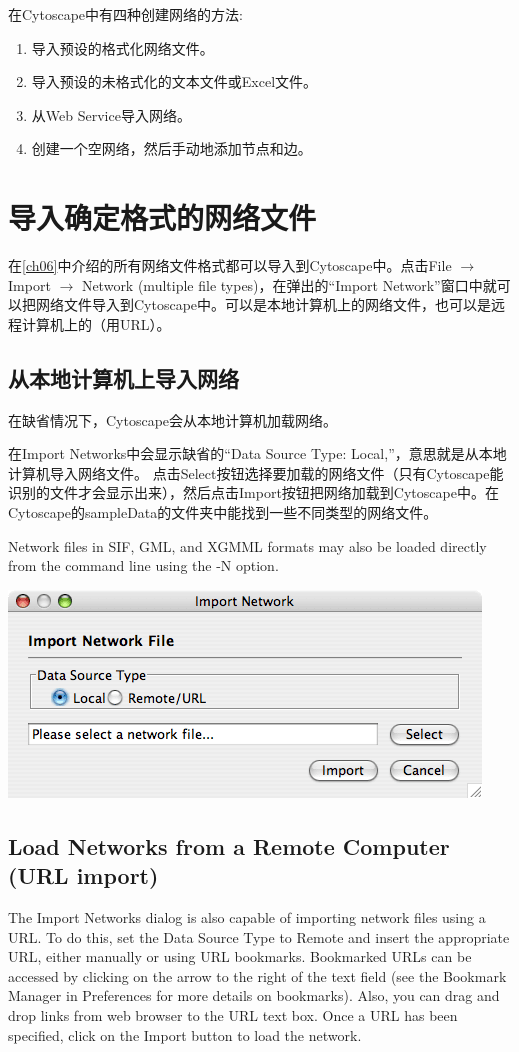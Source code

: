 在Cytoscape中有四种创建网络的方法:
\begin{enumerate}
\item 导入预设的格式化网络文件。
\item 导入预设的未格式化的文本文件或Excel文件。
\item 从Web Service导入网络。
\item 创建一个空网络，然后手动地添加节点和边。
\end{enumerate}
\section{导入确定格式的网络文件}

在\ref{ch06}中介绍的所有网络文件格式都可以导入到Cytoscape中。点击File $\rightarrow$ Import $\rightarrow$ Network (multiple file types)，在弹出的``Import Network''窗口中就可以把网络文件导入到Cytoscape中。可以是本地计算机上的网络文件，也可以是远程计算机上的（用URL）。

 \subsection{从本地计算机上导入网络}
在缺省情况下，Cytoscape会从本地计算机加载网络。

在Import Networks中会显示缺省的``Data Source Type: Local,''，意思就是从本地计算机导入网络文件。 点击Select按钮选择要加载的网络文件（只有Cytoscape能识别的文件才会显示出来），然后点击Import按钮把网络加载到Cytoscape中。在Cytoscape的sampleData的文件夹中能找到一些不同类型的网络文件。 

 Network files in SIF, GML, and XGMML formats may also be loaded directly from the command line using the -N option. 
\begin{center}
\includegraphics[width=\textwidth]{images/network_import_dialog1_25.png} 
\end{center}

\subsection{Load Networks from a Remote Computer (URL import)}
 The Import Networks dialog is also capable of importing network files using a URL. To do this, set the Data Source Type to Remote and insert the appropriate URL, either manually or using URL bookmarks. Bookmarked URLs can be accessed by clicking on the arrow to the right of the text field (see the Bookmark Manager in Preferences for more details on bookmarks). Also, you can drag and drop links from web browser to the URL text box. Once a URL has been specified, click on the Import button to load the network. 

